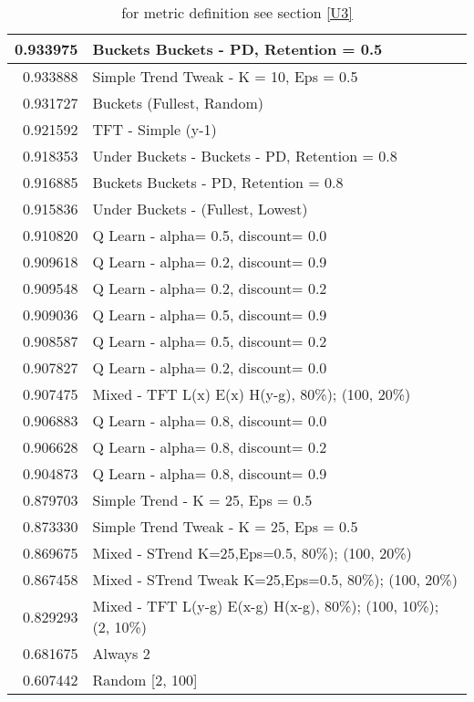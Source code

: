 \begin{table}[!hbtp]
\begin{footnotesize}
\begin{tabular}{|r|l|}
0.933975 & Buckets Buckets - PD, Retention = 0.5\\ \hline
0.933888 & Simple Trend Tweak - K = 10, Eps = 0.5\\ \hline
0.931727 & Buckets (Fullest, Random)\\ \hline
0.921592 & TFT - Simple (y-1)\\ \hline
0.918353 & Under Buckets - Buckets - PD, Retention = 0.8\\ \hline
0.916885 & Buckets Buckets - PD, Retention = 0.8\\ \hline
0.915836 & Under Buckets - (Fullest, Lowest)\\ \hline
0.910820 & Q Learn - alpha= 0.5, discount= 0.0\\ \hline
0.909618 & Q Learn - alpha= 0.2, discount= 0.9\\ \hline
0.909548 & Q Learn - alpha= 0.2, discount= 0.2\\ \hline
0.909036 & Q Learn - alpha= 0.5, discount= 0.9\\ \hline
0.908587 & Q Learn - alpha= 0.5, discount= 0.2\\ \hline
0.907827 & Q Learn - alpha= 0.2, discount= 0.0\\ \hline
0.907475 & Mixed - {TFT L(x) E(x) H(y-g), 80\%); (100, 20\%)}\\ \hline
0.906883 & Q Learn - alpha= 0.8, discount= 0.0\\ \hline
0.906628 & Q Learn - alpha= 0.8, discount= 0.2\\ \hline
0.904873 & Q Learn - alpha= 0.8, discount= 0.9\\ \hline
0.879703 & Simple Trend - K = 25, Eps = 0.5\\ \hline
0.873330 & Simple Trend Tweak - K = 25, Eps = 0.5\\ \hline
0.869675 & Mixed - {STrend K=25,Eps=0.5, 80\%); (100, 20\%)}\\ \hline
0.867458 & Mixed - {STrend Tweak K=25,Eps=0.5, 80\%); (100, 20\%)}\\ \hline
0.829293 & Mixed - {TFT L(y-g) E(x-g) H(x-g), 80\%); (100, 10\%); (2, 10\%)}\\ \hline
0.681675 & Always 2\\ \hline
0.607442 & Random [2, 100]\\ \hline
\end{tabular}
\caption{for metric definition see section \eqref{U3}}
\end{footnotesize}
\end{table}

